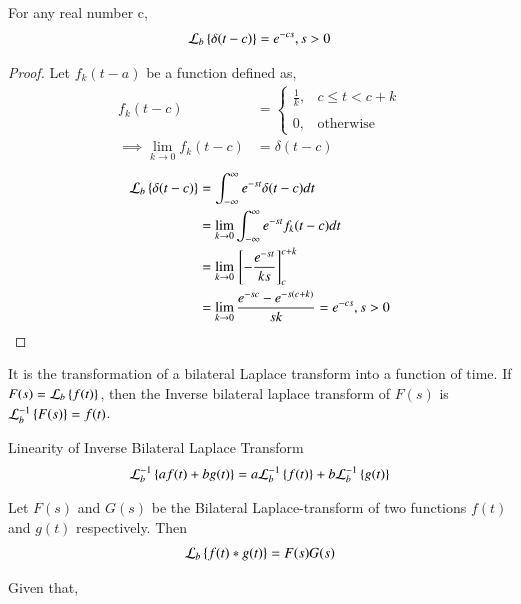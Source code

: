 \documentclass[journal,12pt,twocolumn]{IEEEtran}
\begin{document}
\begin{lemma}
For any real number c,
\begin{align}
     \mathcal{L}_b\left\{\delta(t-c)\right\}=e^{-cs}, s>0\label{eq:d}
\end{align}     
\end{lemma}
\begin{proof}
 Let $f_k(t-a)$ be a function defined as,
 \begin{align}
     f_k(t-c)&= \begin{cases}
    \frac{1}{k}, & c \leq t < c+k \\~\\[-1em]
	0, & \text{otherwise}
	\end{cases}\\
	\implies\lim_{k \to 0} f_k(t-c) &= \delta(t-c)
 \end{align}
\begin{align}
     \mathcal{L}_b\left\{\delta(t-c)\right\}&=\int_{-\infty}^{\infty}e^{-st}\delta(t-c)dt\\&=\lim_{k \to 0}\int_{-\infty}^{\infty}e^{-st}f_k(t-c)dt\\
     &=\lim_{k \to 0}{}\left[-\dfrac{e^{-st}}{ks}\right]_{c}^{c+k}\\&= \lim_{k \to 0}\dfrac{e^{-sc}-e^{-s(c+k)}}{sk} =e^{-cs}, s>0
\end{align}     
\end{proof}
\begin{definition}
It is the transformation of a bilateral Laplace transform into a function of time. If $F(s)=\mathcal{L}_b\left\{f(t)\right\}$, then the Inverse bilateral laplace transform of $F(s)$ is $\mathcal{L}_{b}^{-1}\left\{F(s)\right\}=f(t)$.
\end{definition}
\begin{lemma}
Linearity of Inverse Bilateral Laplace Transform
\begin{align}
    \mathcal{L}_{b}^{-1}\left\{af(t)+bg(t)\right\} = a\mathcal{L}_{b}^{-1}\left\{f(t)\right\}+b\mathcal{L}_{b}^{-1}\left\{g(t)\right\}\label{eq:linearity-1}
\end{align}
\end{lemma}
\begin{theorem} \label{ct}
Let $F(s)$ and $G(s)$ be the Bilateral Laplace-transform of two functions $f(t)$ and $g(t)$ respectively. Then
\begin{align}
\mathcal{L}_{b}\left\{f(t) * g(t)\right\}=F(s)G(s)
\end{align}
\end{theorem}
Given that,
\end{document}
